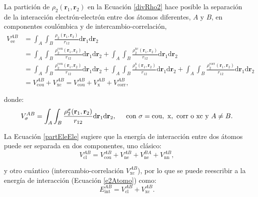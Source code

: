 La partición de $\rho_2(\mathbf{r}_1,\mathbf{r}_2)$ en la Ecuación
\ref{divRho2} hace posible la separación de la interacción electrón-electrón
entre dos átomos diferentes, $A$  y $B$, en componentes coulómbica y de
intercambio-correlación, 
%
\begin{align} 
  V_{\mathrm{ee}}^{AB} &= \int_A \int_B
  \frac{\rho_2(\mathbf{r}_1,\mathbf{r}_2)}{r_{12}} \mathrm{d} \mathbf{r}_1 \mathrm{d} \mathbf{r}_2 \nonumber \\
  &= \int_A \int_B \frac{\rho_2^\mathrm{cou}(\mathbf{r}_1,\mathbf{r}_2)}{r_{12}}
    \mathrm{d}
    \mathbf{r}_1 \mathrm{d} \mathbf{r}_2 + 
    \int_A \int_B \frac{\rho_2^{\mathrm{xc}}(\mathbf{r}_1,\mathbf{r}_2)}{r_{12}}
    \mathrm{d}
    \mathbf{r}_1 \mathrm{d} \mathbf{r}_2 \nonumber \\
  &= \int_A \int_B \frac{\rho_2^\mathrm{cou}(\mathbf{r}_1,\mathbf{r}_2)}{r_{12}}
    \mathrm{d}
    \mathbf{r}_1 \mathrm{d} \mathbf{r}_2 + 
    \int_A \int_B \frac{\rho_2^{\mathrm{x}}(\mathbf{r}_1,\mathbf{r}_2)}{r_{12}}
    \mathrm{d}
    \mathbf{r}_1 \mathrm{d} \mathbf{r}_2 +
    \int_A \int_B \frac{\rho_2^{\mathrm{corr}}(\mathbf{r}_1,\mathbf{r}_2)}{r_{12}}
    \mathrm{d}
    \mathbf{r}_1 \mathrm{d} \mathbf{r}_2 \nonumber \\
  &= V^{AB}_\mathrm{cou} + V^{AB}_{\mathrm{xc}} =
    V^{AB}_\mathrm{cou} + V^{AB}_\mathrm{x} + V^{AB}_{\mathrm{corr}}, \label{partEleEle}
\end{align}

\noindent donde:
%
\begin{equation} \label{elementosEleEleAtomos} 
  V^{AB}_{\sigma} = \int_A \int_B \frac{\rho_2^\sigma(\mathbf{r}_1,
  \mathbf{r}_2)}{r_{12}}
  \mathrm{d} \mathbf{r}_1 \mathrm{d} \mathbf{r}_2 , \hspace*{0.5cm}
  \mbox{con $\sigma = \mathrm{cou, \ x, \ corr}$ o $\mathrm{xc}$ y $A \neq B$}. \\
\end{equation}

La Ecuación \ref{partEleEle} sugiere que la energía de interacción entre dos
átomos puede ser separada en dos componentes, uno clásico:
%
\begin{equation} \label{eleEleClas}
V^{AB}_{\mathrm{cl}} = V^{AB}_\mathrm{cou} + V^{AB}_{\mathrm{ne}} + V^{BA}_{\mathrm{ne}} + V^{AB}_{\mathrm{nn}},
\end{equation} 

\noindent y otro cuántico (intercambio-correlación $V_{\mathrm{xc}}^{AB}$), por
lo que se puede reescribir a la energía de interacción (Ecuación
\ref{e2Atomo}) como:
%
\begin{equation} \label{intClXC}
E^{AB}_{\mathrm{int}} = V^{AB}_{\mathrm{cl}} + V^{AB}_{\mathrm{xc}}.
\end{equation}

